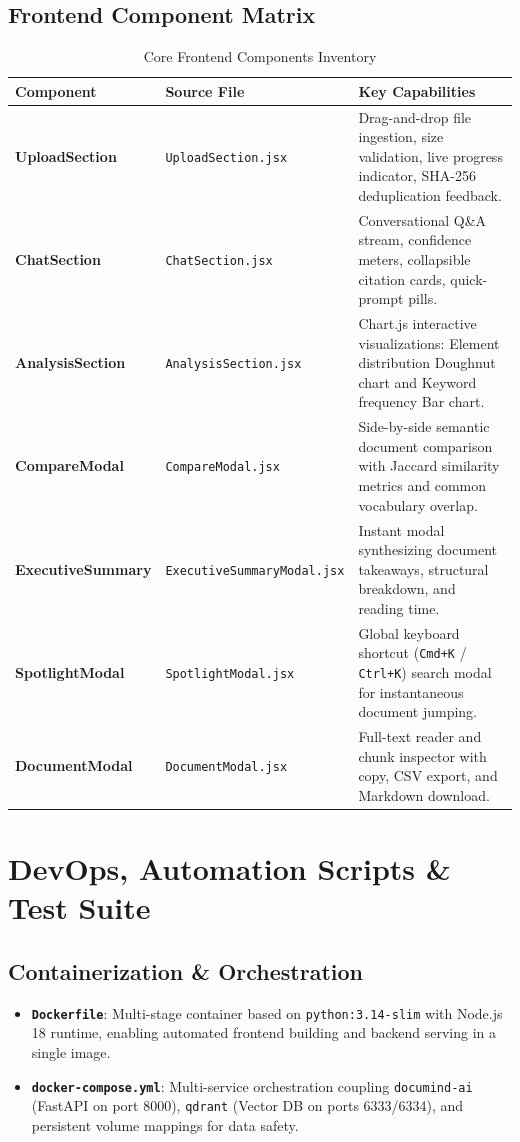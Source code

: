 \documentclass[11pt,a4paper]{article}
\begin{document}
\subsection{Frontend Component Matrix}
\begin{table}[h!]
\centering
\small
\begin{tabularx}{\textwidth}{llX}
\toprule
\textbf{Component} & \textbf{Source File} & \textbf{Key Capabilities} \\
\midrule
\textbf{UploadSection} & \texttt{UploadSection.jsx} & Drag-and-drop file ingestion, size validation, live progress indicator, SHA-256 deduplication feedback. \\
\textbf{ChatSection} & \texttt{ChatSection.jsx} & Conversational Q\&A stream, confidence meters, collapsible citation cards, quick-prompt pills. \\
\textbf{AnalysisSection} & \texttt{AnalysisSection.jsx} & Chart.js interactive visualizations: Element distribution Doughnut chart and Keyword frequency Bar chart. \\
\textbf{CompareModal} & \texttt{CompareModal.jsx} & Side-by-side semantic document comparison with Jaccard similarity metrics and common vocabulary overlap. \\
\textbf{ExecutiveSummary} & \texttt{ExecutiveSummaryModal.jsx} & Instant modal synthesizing document takeaways, structural breakdown, and reading time. \\
\textbf{SpotlightModal} & \texttt{SpotlightModal.jsx} & Global keyboard shortcut (\texttt{Cmd+K} / \texttt{Ctrl+K}) search modal for instantaneous document jumping. \\
\textbf{DocumentModal} & \texttt{DocumentModal.jsx} & Full-text reader and chunk inspector with copy, CSV export, and Markdown download. \\
\bottomrule
\end{tabularx}
\caption{Core Frontend Components Inventory}
\end{table}

\section{DevOps, Automation Scripts \& Test Suite}

\subsection{Containerization \& Orchestration}
\begin{itemize}[leftmargin=*]
    \item \textbf{\texttt{Dockerfile}}: Multi-stage container based on \texttt{python:3.14-slim} with Node.js 18 runtime, enabling automated frontend building and backend serving in a single image.
    \item \textbf{\texttt{docker-compose.yml}}: Multi-service orchestration coupling \texttt{documind-ai} (FastAPI on port 8000), \texttt{qdrant} (Vector DB on ports 6333/6334), and persistent volume mappings for data safety.
\end{itemize}
\end{document}

